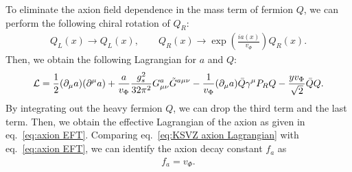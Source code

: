 \documentclass[11pt,a4paper]{article}
\begin{document}
To eliminate the axion field dependence in the mass term of fermion $Q$, we can perform the following chiral rotation of $Q_R$:
\begin{align}
    Q_L(x) \to Q_L(x), \qquad
    Q_R(x) \to \exp\left( \frac{ia(x)}{v_\Phi} \right) Q_R(x).
\end{align}
Then, we obtain the following Lagrangian for $a$ and $Q$:
\begin{align}
    {\cal L} = \frac{1}{2} (\partial_\mu a)(\partial^\mu a) + \frac{a}{v_\Phi} \frac{g_s^2}{32\pi^2} G_{\mu\nu}^a \tilde G^{a\mu\nu} - \frac{1}{v_\Phi} (\partial_\mu a) \bar Q \gamma^\mu P_R Q - \frac{y v_\Phi}{\sqrt{2}} \bar Q Q. \label{eq:KSVZ axion Lagrangian}
\end{align}
By integrating out the heavy fermion $Q$, we can drop the third term and the last term. Then, we obtain the effective Lagrangian of the axion as given in eq.~\eqref{eq:axion EFT}.
Comparing eq.~\eqref{eq:KSVZ axion Lagrangian} with eq.~\eqref{eq:axion EFT}, we can identify the axion decay constant $f_a$ as
\begin{align}
    f_a = v_\Phi.
\end{align}
\end{document}
